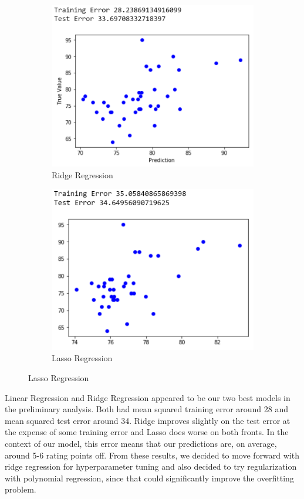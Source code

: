 \documentclass{article}
\begin{document}
\begin{figure}[h]
\begin{subfigure}{0.5\textwidth}
\includegraphics[width=0.9\linewidth]{nbaridgereg.png} 
\caption{Ridge Regression}
\end{subfigure}
\begin{subfigure}{0.5\textwidth}
\includegraphics[width=0.9\linewidth]{nbalassoreg.png}
\caption{Lasso Regression}
\end{subfigure}
\end{figure}
Linear Regression and Ridge Regression appeared to be our two best models in the preliminary analysis. Both had mean squared training error around 28 and mean squared test error around 34. Ridge improves slightly on the test error at the expense of some training error and Lasso does worse on both fronts. In the context of our model, this error means that our predictions are, on average, around 5-6 rating points off. From these results, we decided to move forward with ridge regression for hyperparameter tuning and also decided to try regularization with polynomial regression, since that could significantly improve the overfitting problem.
\end{document}
